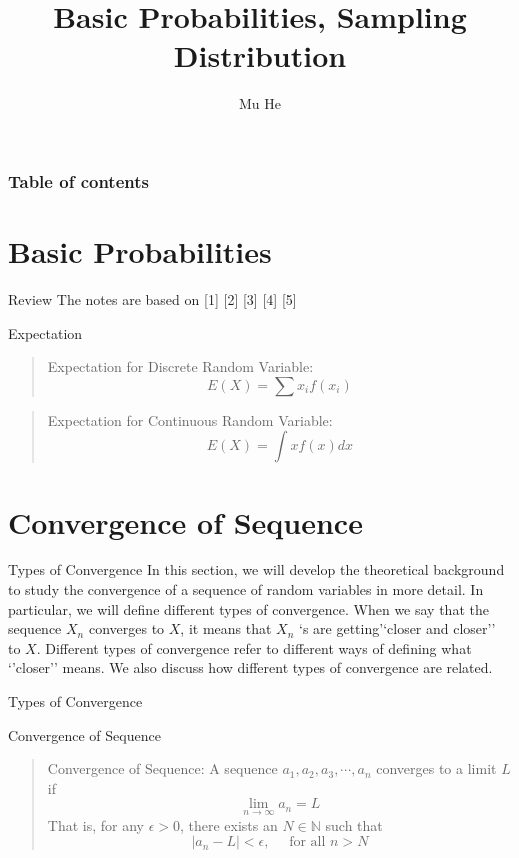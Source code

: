 \documentclass[
  ignorenonframetext,
  aspectratio=43,
]{beamer}
\title{Basic Probabilities, Sampling Distribution}
\author{Mu He}
\date{}
\institute{Xi'an Jiaotong-Liverpool University}
\renewcommand*\contentsname{Table of contents}
\newcommand\contentsname{Table of contents}
\begin{document}
\frame{\titlepage}

\renewcommand*\contentsname{Table of contents}
\begin{frame}[allowframebreaks]
  \frametitle{Table of contents}
  \tableofcontents[hideallsubsections]
\end{frame}
\section{Basic Probabilities}\label{basic-probabilities}

\begin{frame}{Review}
\label{review}
The notes are based on {[}1{]} {[}2{]} {[}3{]} {[}4{]} {[}5{]}

\begin{block}{Expectation}
\label{expectation}
\begin{quote}
Expectation for Discrete Random Variable: \[
E(X)=\sum x_i f(x_i)
\]
\end{quote}

\begin{quote}
Expectation for Continuous Random Variable: \[
E(X)=\int x f(x) dx
\]
\end{quote}
\end{block}
\end{frame}

\section{Convergence of Sequence}\label{convergence-of-sequence}

\begin{frame}{Types of Convergence}
\label{types-of-convergence}
In this section, we will develop the theoretical background to study the
convergence of a sequence of random variables in more detail. In
particular, we will define different types of convergence. When we say
that the sequence \(X_n\) converges to \(X\), it means that \(X_n\) `s
are getting'`closer and closer'' to \(X\). Different types of
convergence refer to different ways of defining what `'closer'' means.
We also discuss how different types of convergence are related.
\end{frame}

\begin{frame}{Types of Convergence}
\label{types-of-convergence-1}
\begin{block}{Convergence of Sequence}
\label{convergence-of-sequence-1}
\begin{quote}
Convergence of Sequence: A sequence \(a_1,a_2,a_3, \cdots, a_n\)
converges to a limit \(L\) if \[
\lim_{n\rightarrow \infty} a_n=L
\] That is, for any \(\epsilon>0\), there exists an \(N\in \mathbb{N}\)
such that \[
|a_n-L|<\epsilon, \quad \text{ for all } n> N
\]
\end{quote}
\end{block}
\end{frame}
\end{document}
